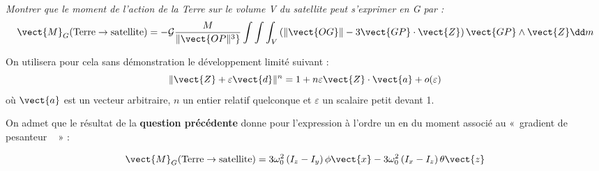 \fi

\subparagraph{\label{q_11}}\textit{ Montrer que le moment de l'action de la Terre sur le volume V du
  satellite peut s'exprimer en G par :}
$$
\vect{M}_G(\text{Terre}\to \text{satellite})=-\mathcal{G}\dfrac{M}{\Vert\vect{OP\Vert^3}}\int\int\int_V\left(\Vert\vect{OG}\Vert-3\vect{GP}\cdot\vect{Z}\right)\vect{GP}\wedge\vect{Z}\dd m
$$  
  
On utilisera pour cela sans démonstration le développement limité suivant :
  $$
  \Vert\vect{Z}+\varepsilon \vect{d} \Vert^n=1+n\varepsilon \vect{Z}\cdot \vect{a}+o(\varepsilon)
  $$
  où $\vect{a}$ est un vecteur arbitraire, $n$ un entier relatif quelconque et $\varepsilon$ un
  scalaire petit devant 1.
\ifprof
\begin{corrige}

\end{corrige}
\else
\fi


\ifprof
\else
On admet que le résultat de la \textbf{question précédente} donne pour
l'expression à l'ordre un en \triplet{\phi}{\theta}{\psi} du moment associé au «~gradient de
pesanteur ~ » :

$$
\vect{M}_G(\text{Terre}\to \text{satellite})=3\omega_0^2\left(I_z-I_y\right)\phi\vect{x}-3\omega_0^2\left(I_x-I_z\right)\theta\vect{z}
$$  

\fi


  
  
